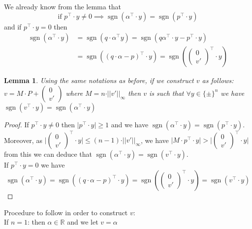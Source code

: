 \documentclass[a4paper,11pt,american]{article}
\newcommand{\R}{\mathbb{R}}
\newcommand{\norm}[1]{\vert\vert#1\vert\vert}
\DeclareMathOperator{\sign}{sgn}
\theoremstyle{plain}
\newtheorem{lemma}[theorem]{Lemma}
\theoremstyle{definition}
\begin{document}
    We already know from the lemma that $$ \text{if } p^\top\cdot y\neq 0\implies\sign(\alpha^\top\cdot y)=\sign(p^\top\cdot y)$$ and if $ p^\top\cdot y=0$ then \begin{align*}
        \sign(\alpha^\top \cdot y)&=\sign(q\cdot \alpha^\top y)=\sign(q\alpha^\top\cdot y-p^\top\cdot y)\\
        &=\sign((q\cdot\alpha-p)^\top\cdot y)=\sign(\begin{pmatrix}
        0\\
        v'
    \end{pmatrix}^\top\cdot y)
    \end{align*}
    \begin{lemma}
        Using the same notations as before, if we construct $v$ as follows: $v=M\cdot P+\begin{pmatrix}
        0\\
        v'
    \end{pmatrix}$ where $M=n\cdot\norm{v'}_{\infty}$ then $v$ is such that $\forall y\in\{\pm\}^{n}$ we have $\sign(v^\top\cdot y)=\sign(\alpha^\top\cdot y)$
    \end{lemma}
    \begin{proof}
        If $p^\top\cdot y\neq 0$ then $\vert p^\top\cdot y\vert\geq 1$ and we have $\sign(\alpha^\top\cdot y)=\sign(p^\top\cdot y)$. Moreover, as $\vert \begin{pmatrix}
            0\\
            v'
        \end{pmatrix}^\top\cdot y\vert\leq (n-1)\cdot \norm{v'}_\infty$, we have $\vert M\cdot p^\top\cdot y\vert>\vert \begin{pmatrix}
            0\\
            v'
        \end{pmatrix}^\top\cdot y\vert$ from this we can deduce that $\sign(\alpha^\top\cdot y)=\sign(v^\top\cdot y)$.\\
        If $p^\top\cdot y=0$ we have $$\sign(\alpha^\top \cdot y)=\sign((q\cdot\alpha-p)^\top\cdot y)=\sign(\begin{pmatrix}
        0\\
        v'
    \end{pmatrix}^\top\cdot y)=\sign(v^\top\cdot y)$$
    \end{proof}
Procedure to follow in order to construct $v$:\\
If $n=1$: then $\alpha\in\R$ and we let $v=\alpha$\\
\end{document}
